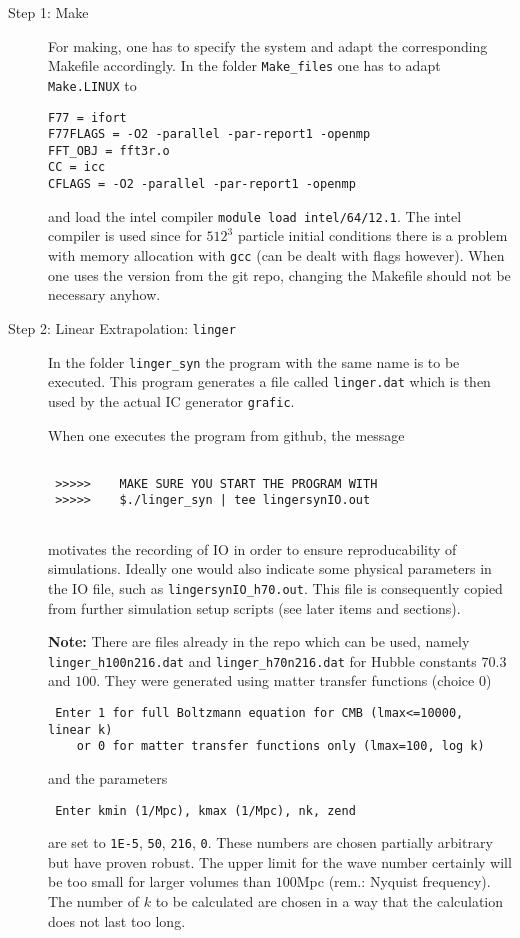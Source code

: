 \documentclass[a4paper,english,10.5pt]{scrartcl}
\begin{document}
\begin{description}

\item[Step 1: Make] 

For making, one has to specify the system and adapt the corresponding 
Makefile accordingly. In the folder \texttt{Make\_files} one has to adapt 
\texttt{Make.LINUX} to 
\begin{verbatim}
F77 = ifort
F77FLAGS = -O2 -parallel -par-report1 -openmp
FFT_OBJ = fft3r.o
CC = icc
CFLAGS = -O2 -parallel -par-report1 -openmp
\end{verbatim}
and load the intel compiler \texttt{module load intel/64/12.1}. The intel 
compiler is used since for $512^3$ particle initial conditions there is a 
problem with memory allocation with \texttt{gcc} (can be dealt with flags however). 
When one uses the version from the git repo, changing the 
Makefile should not be necessary anyhow. 

\item[Step 2: Linear Extrapolation: \texttt{linger}] 

In the folder \texttt{linger\_syn} the program with the same name is to 
be executed. This program generates a file called \texttt{linger.dat} which 
is then used by the actual IC generator \texttt{grafic}. 

When one executes the program from github, the message 
\begin{verbatim} 
 	
 >>>>>    MAKE SURE YOU START THE PROGRAM WITH
 >>>>>    $./linger_syn | tee lingersynIO.out
 	
\end{verbatim}
motivates the recording of IO in order to ensure reproducability of simulations. 
Ideally one would also indicate some physical parameters in 
the IO file, such as \texttt{lingersynIO\_h70.out}. This file is 
consequently copied from further simulation setup scripts (see later 
items and sections). 

\textbf{Note: } There are files already in the repo which can be used, namely 
\texttt{linger\_h100n216.dat} and  \texttt{linger\_h70n216.dat} for 
Hubble constants $70.3$ and $100$. They were 
generated using matter transfer functions (choice 0) 
\begin{verbatim}
 Enter 1 for full Boltzmann equation for CMB (lmax<=10000, linear k)
    or 0 for matter transfer functions only (lmax=100, log k)
\end{verbatim}
and the parameters 
\begin{verbatim}
 Enter kmin (1/Mpc), kmax (1/Mpc), nk, zend
\end{verbatim}
are set to \texttt{1E-5}, \texttt{50}, \texttt{216}, \texttt{0}. 
These numbers are chosen partially arbitrary but have proven 
robust. The upper limit for the wave number certainly will be too small 
for larger volumes than $100$Mpc (rem.: Nyquist frequency). The 
number of $k$ to be calculated are chosen in a way that the calculation 
does not last too long. 


\end{description}
\end{document}
